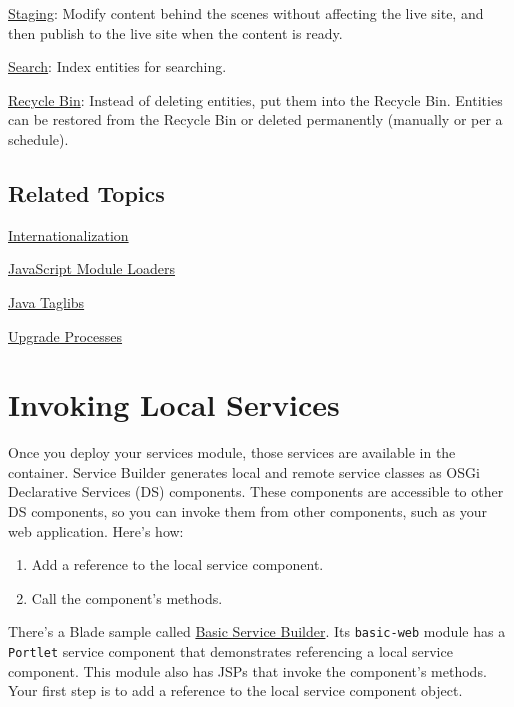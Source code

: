 \href{/docs/7-2/frameworks/-/knowledge_base/f/staging}{Staging}: Modify
content behind the scenes without affecting the live site, and then
publish to the live site when the content is ready.

\href{/docs/7-2/frameworks/-/knowledge_base/f/search}{Search}: Index
entities for searching.

\href{/docs/7-2/frameworks/-/knowledge_base/f/moving-entities-to-the-recycle-bin}{Recycle
Bin}: Instead of deleting entities, put them into the Recycle Bin.
Entities can be restored from the Recycle Bin or deleted permanently
(manually or per a schedule).

\section{Related Topics}\label{related-topics-20}

\href{/docs/7-2/customization/-/knowledge_base/c/overriding-language-keys}{Internationalization}

\href{/docs/7-2/frameworks/-/knowledge_base/f/javascript-module-loaders}{JavaScript
Module Loaders}

\href{/docs/7-2/reference/-/knowledge_base/r/front-end-taglibs}{Java
Taglibs}

\href{/docs/7-2/frameworks/-/knowledge_base/f/upgrade-processes}{Upgrade
Processes}

\chapter{Invoking Local Services}\label{invoking-local-services}

Once you deploy your services module, those services are available in
the container. Service Builder generates local and remote service
classes as OSGi Declarative Services (DS) components. These components
are accessible to other DS components, so you can invoke them from other
components, such as your web application. Here's how:

\begin{enumerate}
\def\labelenumi{\arabic{enumi}.}
\item
  Add a reference to the local service component.
\item
  Call the component's methods.
\end{enumerate}

There's a Blade sample called
\href{/docs/7-2/reference/-/knowledge_base/r/service-builder-samples}{Basic
Service Builder}. Its \texttt{basic-web} module has a \texttt{Portlet}
service component that demonstrates referencing a local service
component. This module also has JSPs that invoke the component's
methods. Your first step is to add a reference to the local service
component object.

